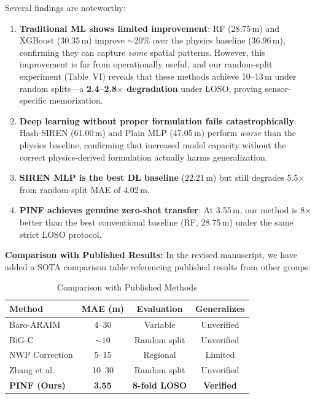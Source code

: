 Several findings are noteworthy:

\begin{enumerate}
    \item \textbf{Traditional ML shows limited improvement}: RF (28.75\,m) and XGBoost (30.35\,m) improve ${\sim}20\%$ over the physics baseline (36.96\,m), confirming they can capture \emph{some} spatial patterns. However, this improvement is far from operationally useful, and our random-split experiment (Table~VI) reveals that these methods achieve 10--13\,m under random splits---a \textbf{2.4--2.8$\times$ degradation} under LOSO, proving sensor-specific memorization.
    \item \textbf{Deep learning without proper formulation fails catastrophically}: Hash-SIREN (61.00\,m) and Plain MLP (47.05\,m) perform \emph{worse} than the physics baseline, confirming that increased model capacity without the correct physics-derived formulation actually harms generalization.
    \item \textbf{SIREN MLP is the best DL baseline} (22.21\,m) but still degrades 5.5$\times$ from random-split MAE of 4.02\,m.
    \item \textbf{PINF achieves genuine zero-shot transfer}: At 3.55\,m, our method is 8$\times$ better than the best conventional baseline (RF, 28.75\,m) under the same strict LOSO protocol.
\end{enumerate}

\textbf{Comparison with Published Results:}
In the revised manuscript, we have added a SOTA comparison table referencing published results from other groups:

\begin{table}[h]
\centering
\caption{Comparison with Published Methods}
\begin{tabular}{lccc}
\toprule
\textbf{Method} & \textbf{MAE (m)} & \textbf{Evaluation} & \textbf{Generalizes} \\
\midrule
Baro-ARAIM \cite{simonetti2024geodetic} & 4--30 & Variable & Unverified \\
BiG-C \cite{narayanan2022enhanced} & ${\sim}10$ & Random split & Unverified \\
NWP Correction \cite{schumann2017use} & 5--15 & Regional & Limited \\
Zhang et al. \cite{zhang2020urban} & 10--30 & Random split & Unverified \\
\midrule
\textbf{PINF (Ours)} & \textbf{3.55} & \textbf{8-fold LOSO} & \textbf{Verified} \\
\bottomrule
\end{tabular}
\end{table}

